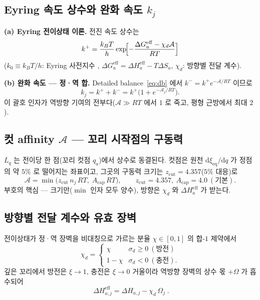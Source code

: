 \documentclass[11pt,a4paper]{article}
\newcommand{\dd}{\mathrm{d}}
\newcommand{\eff}{\mathrm{eff}}
\newcommand{\eq}{\mathrm{eq}}
\begin{document}
\subsection{Eyring 속도 상수와 완화 속도 $k_j$}

\textbf{(a) Eyring 전이상태 이론.} 전진 속도 상수는
\begin{equation}
k^+ = \frac{k_BT}{h}\exp\!\Bigl[-\frac{\Delta G_a^\eff - \chi_d\mathcal A}{RT}\Bigr]
\label{eq:eyring}
\end{equation}
($k_0 \equiv k_BT/h$: Eyring 사전지수 \cite{eyring1935},
$\Delta G_a^\eff = \Delta H_a^\eff - T\Delta S_a$, $\chi_d$: 방향별 전달 계수).

\textbf{(b) 완화 속도 — 정·역 합.} Detailed balance~\eqref{eq:db} 에서 $k^- = k^+ e^{-\mathcal A/RT}$ 이므로
\begin{equation}
k_j = k^+ + k^- = k^+\bigl(1+e^{-\mathcal A_j/RT}\bigr).
\label{eq:kuniv}
\end{equation}
이 괄호 인자가 역방향 기여의 전부다($\mathcal A\gg RT$ 에서 $1$ 로 죽고, 평형 근방에서 최대 $2$).

\subsection{컷 affinity $\mathcal A$ — 꼬리 시작점의 구동력}
$L_q$ 는 전이당 한 점(꼬리 컷점 $q_a$)에서 상수로 동결된다. 컷점은 원천 $\dd\xi_\eq/\dd q$ 가
정점의 약 $5\%$ 로 떨어지는 좌표이고, 그곳의 구동력 크기는 $z_\mathrm{cut}=4.357$($5\%$ 대응)로
\begin{equation}
\mathcal A=\min\!\big(z_\mathrm{cut}\,n_j\,RT,\;A_\mathrm{cap}\,RT\big),
\qquad z_\mathrm{cut}=4.357,\ A_\mathrm{cap}=4.0\ (\text{기본}).
\label{eq:Acut}
\end{equation}
부호의 핵심 — 크기만($\min$ 인자 모두 양수), 방향은 $\chi_d$ 와 $\Delta H_a^\eff$ 가 받는다.

\subsection{방향별 전달 계수와 유효 장벽}
전이상태가 정·역 장벽을 비대칭으로 가르는 분율 $\chi \in [0,1]$ 의 합-$1$ 제약에서
\begin{equation}
\chi_d=\begin{cases}\chi & \sigma_d\ge0\ (\text{방전})\\ 1-\chi & \sigma_d<0\ (\text{충전}).\end{cases}
\label{eq:chid}
\end{equation}
깊은 꼬리에서 방전은 $\xi\to1$, 충전은 $\xi\to0$ 거울이라 역방향 장벽의 상수 몫 $+\Omega$ 가
흡수되어
\begin{equation}
\boxed{\;\Delta H_{a,j}^\eff=\Delta H_{a,j}-\chi_d\,\Omega_j\;.}
\label{eq:dHeff}
\end{equation}
\end{document}
